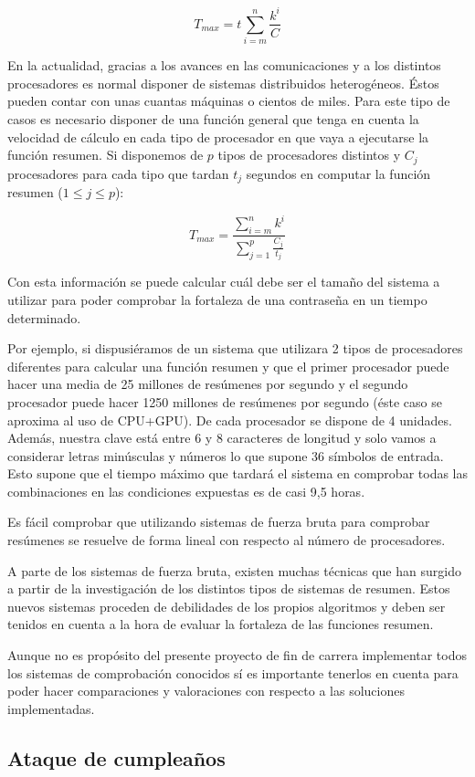 $$ T_{max}=t\sum^n_{i=m}\frac{k^i}{C} $$

En la actualidad, gracias a los avances en las comunicaciones y a los distintos procesadores es normal disponer de sistemas distribuidos heterogéneos. Éstos pueden contar con unas cuantas máquinas o cientos de miles. Para este tipo de casos es necesario disponer de una función general que tenga en cuenta la velocidad de cálculo en cada tipo de procesador en que vaya a ejecutarse la función resumen. Si disponemos de $p$ tipos de procesadores distintos y $C_j$ procesadores para cada tipo que tardan $t_j$ segundos en computar la función resumen ($1 \leq j \leq p$):

$$ T_{max}=\frac{\sum^n_{i=m}k^i}{\sum^p_{j=1}\frac{C_j}{t_j}}$$
 
Con esta información  se puede calcular cuál debe ser el tamaño del sistema a utilizar para poder comprobar la fortaleza de una contraseña en un tiempo determinado.

Por ejemplo, si dispusiéramos de un sistema que utilizara 2 tipos de procesadores diferentes para calcular una función resumen y que el primer procesador puede hacer una media de 25 millones de resúmenes por segundo y el segundo procesador puede hacer 1250 millones de resúmenes por segundo (éste caso se aproxima al uso de CPU+GPU). De cada procesador se dispone de 4 unidades. Además, nuestra clave está entre 6 y 8 caracteres de longitud y solo vamos a considerar letras minúsculas y números lo que supone 36 símbolos de entrada. Esto supone que el tiempo máximo que tardará el sistema en comprobar todas las combinaciones en las condiciones expuestas es de casi 9,5 horas.

Es fácil comprobar que utilizando sistemas de fuerza bruta para comprobar resúmenes se resuelve de forma lineal con respecto al número de procesadores.

A parte de los sistemas de fuerza bruta, existen muchas técnicas que han surgido a partir de la investigación de los distintos tipos de sistemas de resumen. Estos nuevos sistemas proceden de debilidades de los propios algoritmos y deben ser tenidos en cuenta a la hora de evaluar la fortaleza de las funciones resumen.

Aunque no es propósito del presente proyecto de fin de carrera implementar todos los sistemas de comprobación conocidos sí es importante tenerlos en cuenta para poder hacer comparaciones y valoraciones con respecto a las soluciones implementadas.

\subsection{Ataque de cumpleaños}

